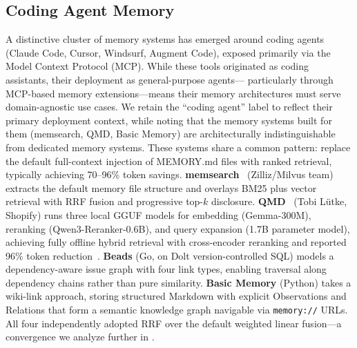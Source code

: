 \subsection{Coding Agent Memory}
\label{sec:coding-agents}

A distinctive cluster of memory systems has emerged around coding
agents (Claude Code, Cursor, Windsurf, Augment Code), exposed primarily
via the Model Context Protocol (MCP).  While these tools originated as
coding assistants, their deployment as general-purpose agents---
particularly through MCP-based memory extensions---means their memory
architectures must serve domain-agnostic use cases.  We retain the
``coding agent'' label to reflect their primary deployment context, while
noting that the memory systems built for them (memsearch, QMD, Basic
Memory) are architecturally indistinguishable from dedicated memory
systems.  These systems share a common pattern:
replace the default full-context injection of MEMORY.md files with
ranked retrieval, typically achieving 70--96\% token savings.
\textbf{memsearch}~\cite{zilliz2026a} (Zilliz/Milvus team) extracts
the default memory file structure and overlays BM25 plus vector
retrieval with RRF fusion and progressive top-$k$ disclosure.
\textbf{QMD}~\cite{lutke2026qmd} (Tobi L\"utke, Shopify) runs three
local GGUF models for embedding (Gemma-300M), reranking
(Qwen3-Reranker-0.6B), and query expansion (1.7B parameter model),
achieving fully offline hybrid retrieval with cross-encoder reranking
and reported 96\% token reduction~\cite{levine2026}. \textbf{Beads}
(Go, on Dolt version-controlled SQL) models a dependency-aware issue
graph with four link types, enabling traversal along dependency chains
rather than pure similarity. \textbf{Basic Memory} (Python) takes a
wiki-link approach, storing structured Markdown with explicit
Observations and Relations that form a semantic knowledge graph
navigable via \texttt{memory://} URLs. All four independently adopted
RRF over the default weighted linear fusion---a convergence we
analyze further in .

